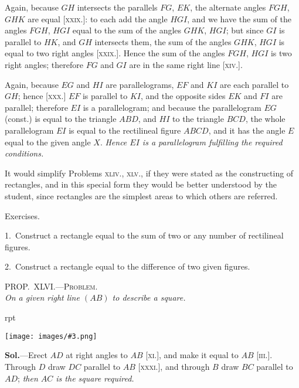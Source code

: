 \documentclass[oneside]{book}
\newcounter{wrapwidth}
\newcommand\myprop[2]{
\bigskip\Needspace*{4\baselineskip}\begin{center}\textsc{#1}\\\medskip\emph{#2}\par\end{center}
}
\newcommand\exhead[1]{
\Needspace*{5\baselineskip}\begin{center}
\textsf{#1}
\end{center}
}
\newcommand\imgflow[3]{
\setcounter{wrapwidth}{#1}
\begin{wrapfigure}[#2]{r}{\value{wrapwidth}pt}
\begin{center}
\vspace{-0.3in}
\texttt{[image: images/\#3.png]}
\end{center}
\end{wrapfigure}
}
\begin{document}
Again, because $GH$ intersects the parallels $FG$, $EK$,
the alternate angles $FGH$, $GHK$ are equal [\textsc{xxix.}]: to
each add the angle $HGI$, and we have the sum of the
angles $FGH$, $HGI$ equal to the sum of the angles $GHK$,
$HGI$; but since $GI$ is parallel to $HK$, and $GH$ intersects
them, the sum of the angles $GHK$, $HGI$ is equal
to two right angles [\textsc{xxix.}]. Hence the sum of the
angles $FGH$, $HGI$ is two right angles; therefore $FG$
and $GI$ are in the same right line [\textsc{xiv}.].

Again, because $EG$ and $HI$ are parallelograms, $EF$
and $KI$ are each parallel to $GH$; hence [\textsc{xxx}.] $EF$ is
parallel to $KI$, and the opposite sides $EK$ and $FI$ are
parallel; therefore $EI$ is a parallelogram; and because
the parallelogram $EG$ (const.) is equal to the triangle
$ABD$, and $HI$ to the triangle $BCD$, the whole parallelogram
$EI$ is equal to the rectilineal figure $ABCD$, and
it has the angle $E$ equal to the given angle $X$. \emph{Hence
$EI$ is a parallelogram fulfilling the required conditions.}\par\medskip

\begin{footnotesize}
It would simplify Problems \textsc{xliv}., \textsc{xlv}., if they were stated as
the constructing of rectangles, and in this special form they
would be better understood by the student, since rectangles are
the simplest areas to which others are referred.
\par\end{footnotesize}


\exhead{Exercises.}

\begin{footnotesize}
1.~Construct a rectangle equal to the sum of two or any
number of rectilineal figures.

2.~Construct a rectangle equal to the difference of two given
figures.
\par\end{footnotesize}


\myprop{PROP\@.~XLVI\@.---Problem.}{On a given right line $(AB)$ to describe a square.}

\imgflow{90}{9}{f255}

\textbf{Sol.}---Erect $AD$ at right angles to $AB$ [\textsc{xi}.], and
make it equal to $AB$ [\textsc{iii}.]. Through
$D$ draw $DC$ parallel to $AB$ [\textsc{xxxi}.],
and through $B$ draw $BC$ parallel to
$AD$; \emph{then $AC$ is the square required.}
\end{document}
